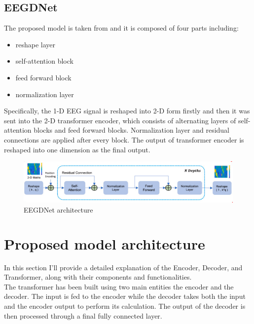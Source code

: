 \documentclass[a4paper, noexaminfo]{sapthesis}
\begin{document}
\subsection{EEGDNet}\label{sec:EEGDNet}
The proposed  model is taken from\cite{EEGDNet} and it is
composed of four parts including:
\begin{itemize}
\item reshape layer
\item self-attention block
\item feed forward block
\item normalization layer
\end{itemize}
 Specifically, the 1-D EEG signal is reshaped into 2-D form firstly and then 
 it was sent into the 2-D transformer encoder, which consists of 
 alternating layers of self-attention blocks and feed forward blocks. 
 Normalization layer and residual connections are applied after every block.
  The output of transformer encoder is reshaped into one dimension as the
   final output. 
\begin{figure}[h!]
\centering
\includegraphics[width=1\linewidth]{images/model_architecture_transformer_fully_connected.PNG}
\caption{EEGDNet architecture}
\end{figure}
\newpage
\section{Proposed model architecture}\label{sec:model_proposed}
In this section I'll provide a detailed explanation of the Encoder, 
Decoder, and Transformer, along with their components and functionalities. \newline \\
The transformer has been built using two main entities the encoder
and the decoder. The input is fed to the encoder while the decoder takes 
both the input and the encoder output to perform its calculation. The
output of the decoder is then processed through a final fully connected layer.
\end{document}
